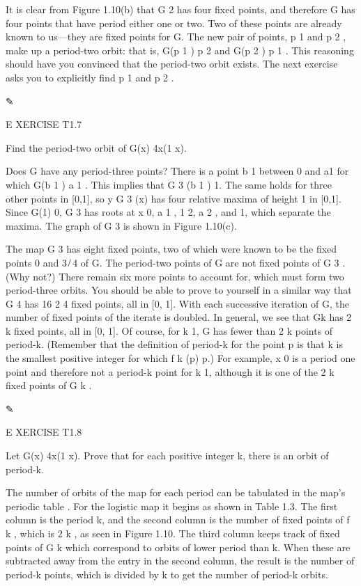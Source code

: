 \documentclass[12pt]{article}
\begin{document}
It is clear from Figure 1.10(b) that G 2 has four ﬁxed points, and therefore G has four points that have 
period either one or two. Two of these points are already known to us—they are ﬁxed points for G. The new 
pair of points, p 1 and p 2 , make up a period-two orbit: that is, G(p 1 )  p 2 and G(p 2 )  p 1 . This 
reasoning should have you convinced that the period-two orbit exists. The next exercise asks you to 
explicitly ﬁnd p 1 and p 2 .

✎

E XERCISE T1.7

Find the period-two orbit of G(x)  4x(1  x).

Does G have any period-three points? There is a point b 1 between 0 and a1  for which G(b 1 )  a 1 . This 
implies that G 3 (b 1 )  1. The same holds for three other points in [0,1], so y  G 3 (x) has four relative 
maxima of height 1 in [0,1]. Since G(1)  0, G 3 has roots at x  0, a 1 , 1  2, a 2 , and 1, which separate 
the maxima. The graph of G 3 is shown in Figure 1.10(c).

The map G 3 has eight ﬁxed points, two of which were known to be the ﬁxed points 0 and 3 ̸ 4 of G. The 
period-two points of G are not ﬁxed points of G 3 . (Why not?) There remain six more points to account 
for, which must form two period-three orbits. You should be able to prove to yourself in a similar way that 
G 4 has 16  2 4 ﬁxed points, all in [0, 1]. With each successive iteration of G, the number of ﬁxed 
points of the iterate is doubled. In general, we see that Gk  has 2 k ﬁxed points, all in [0, 1]. Of 
course, for k 
 1, G has fewer than 2 k points of period-k. (Remember that the deﬁnition of period-k for the point p is 
that k is the smallest positive integer for which f k (p)  p.) For example, x  0 is a period one point and 
therefore not a period-k point for k 
 1, although it is one of the 2 k ﬁxed points of G k .

✎

E XERCISE T1.8

Let G(x)  4x(1  x). Prove that for each positive integer k, there is an orbit of period-k.


The number of orbits of the map for each period can be tabulated in the map’s periodic table . For the 
logistic map it begins as shown in Table 1.3. The ﬁrst column is the period k, and the second column is 
the number of ﬁxed points of f k , which is 2 k , as seen in Figure 1.10. The third column keeps track of 
ﬁxed points of G k which correspond to orbits of lower period than k. When these are subtracted away from 
the entry in the second column, the result is the number of period-k points, which is divided by k to get 
the number of period-k orbits.
\end{document}
